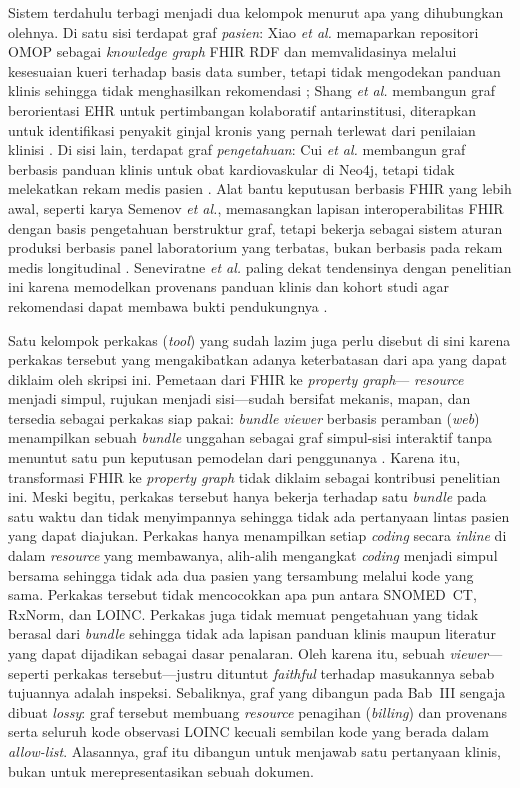 Sistem terdahulu terbagi menjadi dua kelompok menurut apa yang dihubungkan olehnya. Di satu sisi terdapat graf
\emph{pasien}: Xiao \textit{et al.} memaparkan repositori OMOP sebagai \emph{knowledge graph}
FHIR RDF dan memvalidasinya melalui kesesuaian kueri terhadap basis data sumber, tetapi
tidak mengodekan panduan klinis sehingga tidak menghasilkan rekomendasi
\cite{xiao2022}; Shang \textit{et al.} membangun graf berorientasi EHR untuk pertimbangan
kolaboratif antarinstitusi, diterapkan untuk identifikasi penyakit ginjal kronis yang
pernah terlewat dari penilaian klinisi \cite{shang2024}. Di sisi lain, terdapat graf \emph{pengetahuan}: Cui
\textit{et al.} membangun graf berbasis panduan klinis untuk obat kardiovaskular di Neo4j, tetapi
tidak melekatkan rekam medis pasien \cite{cui2025}. Alat bantu keputusan
berbasis FHIR yang lebih awal, seperti karya Semenov \textit{et al.}, memasangkan lapisan
interoperabilitas FHIR dengan basis pengetahuan berstruktur graf, tetapi
bekerja sebagai sistem aturan produksi berbasis panel laboratorium yang terbatas,
bukan berbasis pada rekam medis longitudinal \cite{semenov2018}. Seneviratne \textit{et al.} paling
dekat tendensinya dengan penelitian ini karena memodelkan provenans panduan klinis dan kohort
studi agar rekomendasi dapat membawa bukti pendukungnya \cite{seneviratne2023}.

Satu kelompok perkakas (\emph{tool}) yang sudah lazim juga perlu disebut di sini karena perkakas tersebut yang
mengakibatkan adanya keterbatasan dari apa yang dapat diklaim oleh skripsi ini. Pemetaan dari FHIR ke \emph{property graph}---
\emph{resource} menjadi simpul, rujukan menjadi sisi---sudah bersifat mekanis,
mapan, dan tersedia sebagai perkakas siap pakai: \emph{bundle viewer} berbasis peramban (\emph{web})
menampilkan sebuah \emph{bundle} unggahan sebagai graf simpul-sisi interaktif tanpa menuntut
satu pun keputusan pemodelan dari penggunanya \cite{tenasol_viewer}. Karena itu, transformasi FHIR ke \emph{property graph}
tidak diklaim sebagai kontribusi penelitian ini. Meski begitu, perkakas tersebut hanya bekerja terhadap satu \emph{bundle}
pada satu waktu dan tidak menyimpannya sehingga tidak ada pertanyaan lintas pasien yang dapat
diajukan. Perkakas hanya menampilkan setiap \emph{coding} secara \emph{inline} di dalam
\emph{resource} yang membawanya, alih-alih mengangkat \emph{coding} menjadi simpul bersama
sehingga tidak ada dua pasien yang tersambung melalui kode yang sama. Perkakas tersebut tidak
mencocokkan apa pun antara SNOMED~CT, RxNorm, dan LOINC. Perkakas juga tidak memuat
pengetahuan yang tidak berasal dari \emph{bundle} sehingga tidak ada lapisan panduan klinis maupun
literatur yang dapat dijadikan sebagai dasar penalaran. Oleh karena itu, sebuah \emph{viewer}---seperti perkakas tersebut---justru
dituntut \emph{faithful} terhadap masukannya sebab tujuannya adalah inspeksi. Sebaliknya,
graf yang dibangun pada Bab~III sengaja dibuat \emph{lossy}: graf tersebut membuang
\emph{resource} penagihan (\emph{billing}) dan provenans serta seluruh kode observasi LOINC
kecuali sembilan kode yang berada dalam \emph{allow-list}. Alasannya, graf itu dibangun
untuk menjawab satu pertanyaan klinis, bukan untuk merepresentasikan sebuah dokumen.


